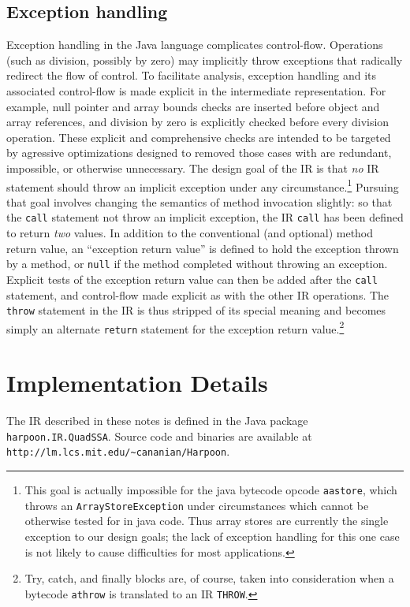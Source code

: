 \documentclass[11pt,notitlepage,twocolumn,twoside]{article}
\begin{document}
\subsection{Exception handling}
Exception handling in the Java language complicates control-flow.
Operations (such as division, possibly by zero) may implicitly throw
exceptions that radically redirect the flow of control.  To facilitate
analysis, exception handling and its associated control-flow is made
explicit in the intermediate representation.  For example, null
pointer and array bounds checks are inserted before object and array
references, and division by zero is explicitly checked before every
division operation.  These explicit and comprehensive checks are
intended to be targeted by agressive optimizations designed to
removed those cases with are redundant, impossible, or otherwise
unnecessary.  The design goal of the IR is that \textit{no} IR
statement should throw an implicit exception under any 
circumstance.\footnote{This goal is actually impossible for the java
bytecode opcode \texttt{aastore}, which throws an
\texttt{ArrayStoreException} under circumstances which cannot be
otherwise tested for in java code.  Thus array stores are
currently the single exception to our design goals; the lack of exception
handling for this one case is not likely to cause difficulties for most
applications.}  Pursuing that goal involves changing the semantics of method
invocation slightly: so that the \texttt{call} statement not throw an
implicit exception, the IR \texttt{call} has been defined to return
\textit{two} values.  In addition to the conventional (and optional)
method return value, an ``exception return value'' is defined to hold
the exception thrown by a method, or \texttt{null} if the method
completed without throwing an exception.  Explicit tests of the
exception return value can then be added after the \texttt{call}
statement, and control-flow made explicit as with the other IR
operations.  The \texttt{throw} statement in the IR is thus stripped
of its special meaning and becomes simply an alternate \texttt{return}
statement for the exception return value.\footnote{Try, catch, and
finally blocks are, of course, taken into consideration when a
bytecode \texttt{athrow} is translated to an IR \texttt{THROW}.}

\section{Implementation Details}

The IR described in these notes is defined in the Java package
\texttt{harpoon.IR.QuadSSA}.  Source code and binaries are available
at {\tt\small http://lm.lcs.mit.edu/\~{}cananian/Harpoon}.
\end{document}
